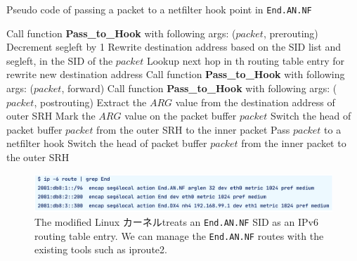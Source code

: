   \begin{algorithm*}[t]
    \caption{Pseudo code of passing a packet to a netfilter hook point in \texttt{End.AN.NF}}
    \small
    \label{alg:end-an-nf}
    \begin{algorithmic}[1]
      \State Call function \textbf{Pass\_to\_Hook} with following args: ($packet$, prerouting)
      \State Decrement segleft by 1
      \State Rewrite destination address based on the SID list and segleft, in the SID of the $packet$
      \State Lookup next hop in th routing table entry for rewrite new destination address
      \State Call function \textbf{Pass\_to\_Hook} with following args: ($packet$, forward)
      \State Call function \textbf{Pass\_to\_Hook} with following args: ($packet$, postrouting)
      \EndFunction
      \fi
      \State Extract the $ARG$ value from the destination address of outer SRH
      \State Mark the $ARG$ value on the packet buffer $packet$
      \EndIf
      \State Switch the head of packet buffer $packet$ from the outer SRH to the inner packet
      \State Pass $packet$ to a netfilter hook
      \State Switch the head of packet buffer $packet$ from the inner packet to the outer SRH
      \EndFunction
    \end{algorithmic}
  \end{algorithm*}
  
  \begin{figure}[t]
    \centering
    \includegraphics[width=0.95\linewidth]{img/End-FW-show-route.pdf}
    \caption{The modified Linux カーネルtreats an \texttt{End.AN.NF} SID as an IPv6 routing table entry. We can manage the \texttt{End.AN.NF} routes with the existing tools such as iproute2.}
    \label{fig:show-route}
  \end{figure}

